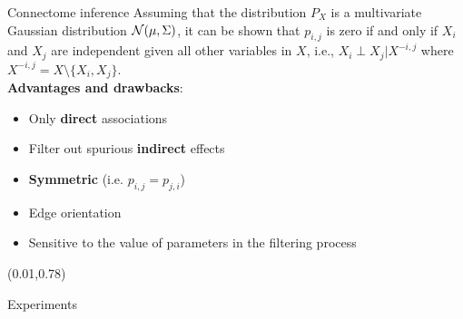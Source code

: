 \documentclass[final]{beamer}
\newcommand{\cmark}{\ding{51}}%
\newcommand{\xmark}{\ding{55}}%
\begin{document}
\begin{frame}{}
\begin{textblock}{0.485}
\begin{block}{Connectome inference \phantom{p}}
Assuming that the distribution $P_X$ is a multivariate Gaussian
distribution ${\cal N}(\mu,\Sigma)$, it can be shown that $p_{i,j}$ is
zero if and only if $X_i$ and $X_j$ are independent given all other
variables in $X$, i.e., $X_i \perp X_j|X^{-i,j}$ where $X^{-i,j}= X
\setminus\{X_i,X_j\}$.\\[3ex]

\textbf{Advantages and drawbacks}:\\[2ex]

\begin{minipage}{0.8\linewidth}
\begin{itemize}
\item[\vspace{1cm}{\color{green} \cmark}] Only \textbf{direct} associations
\item[\vspace{1cm}{\color{green} \cmark}] Filter out spurious \textbf{indirect} effects
\item[\vspace{1cm}{\color{green} \cmark}] \textbf{Symmetric} (i.e. $p_{i,j}=p_{j,i}$)\\[3ex]
\item[\vspace{1cm}{\color{red} \xmark}] Edge orientation
\item[\vspace{1cm}{\color{red} \xmark}] Sensitive to the value of parameters in the filtering process
\end{itemize}
\end{minipage}

\end{block}

\end{textblock}


\begin{textblock}{0.74}(0.01,0.78)

\begin{block}{Experiments \phantom{p}}


\end{block}
\end{textblock}
\end{frame}
\end{document}
